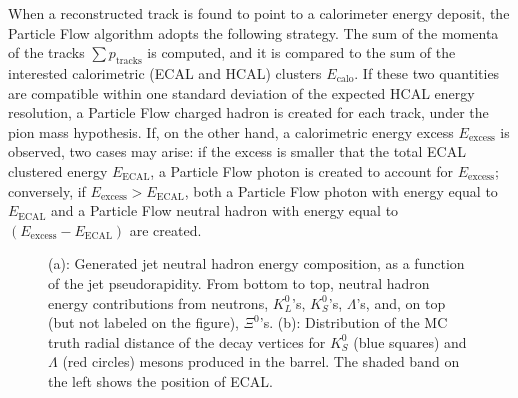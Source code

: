 \documentclass{cmspaper}
\begin{document}
When a reconstructed track is found to point to a calorimeter energy deposit, the Particle Flow algorithm adopts the following strategy. The sum of the momenta of the tracks $\sum p_{\mathrm{tracks}}$ is computed, and it is compared to the sum of the interested calorimetric (ECAL and HCAL) clusters $E_{\mathrm{calo}}$. If these two quantities are compatible within one standard deviation of the expected HCAL energy resolution, a Particle Flow charged hadron is created for each track, under the pion mass hypothesis. If, on the other hand, a calorimetric energy excess $E_{\mathrm{excess}}$ is observed, two cases may arise: if the excess is smaller that the total ECAL clustered energy $E_{\mathrm{ECAL}}$, a Particle Flow photon is created to account for $E_{\mathrm{excess}}$; conversely, if $E_{\mathrm{excess}} > E_{\mathrm{ECAL}}$, both a Particle Flow photon with energy equal to $E_{\mathrm{ECAL}}$ and a Particle Flow neutral hadron with energy equal to $(E_{\mathrm{excess}} - E_{\mathrm{ECAL}})$ are created.


\begin{figure}[tb]
\centering
{}
\caption{(a): Generated jet neutral hadron energy composition, as a function of the jet pseudorapidity. From bottom to top, neutral hadron energy contributions from neutrons, $K^0_L$'s, $K^0_S$'s, $\Lambda$'s, and, on top (but not labeled on the figure), $\Xi^0$'s. (b): Distribution of the MC truth radial distance of the decay vertices for $K^0_S$ (blue squares) and $\Lambda$ (red circles) mesons produced in the barrel. The shaded band on the left shows the position of ECAL. \label{fig:stackNH}}
\end{figure}
\end{document}
